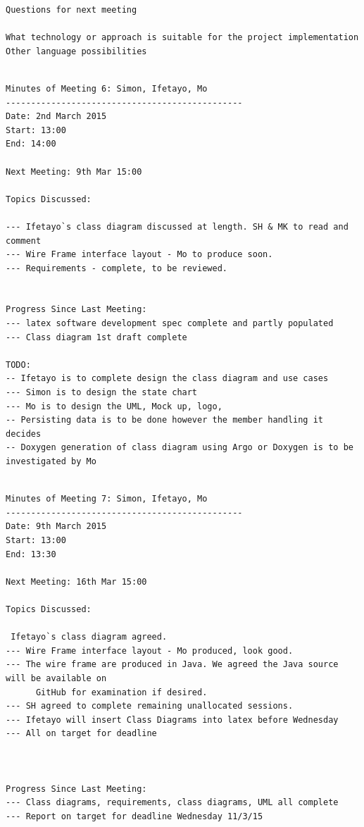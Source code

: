 \documentclass[a4paper,10pt]{article}
\begin{document}
\begin{appendices}
\begin{lstlisting}[frame=single,caption=Meeting of 26/2/15,label=minutes5]
Questions for next meeting

What technology or approach is suitable for the project implementation
Other language possibilities

\end{lstlisting}

\begin{lstlisting}[frame=single,caption=Meeting of 2/3/15,label=minutes6]

Minutes of Meeting 6: Simon, Ifetayo, Mo
-----------------------------------------------
Date: 2nd March 2015
Start: 13:00
End: 14:00

Next Meeting: 9th Mar 15:00

Topics Discussed:

--- Ifetayo`s class diagram discussed at length. SH & MK to read and comment
--- Wire Frame interface layout - Mo to produce soon.
--- Requirements - complete, to be reviewed.


Progress Since Last Meeting:
--- latex software development spec complete and partly populated
--- Class diagram 1st draft complete

TODO:
-- Ifetayo is to complete design the class diagram and use cases
--- Simon is to design the state chart
--- Mo is to design the UML, Mock up, logo, 
-- Persisting data is to be done however the member handling it decides
-- Doxygen generation of class diagram using Argo or Doxygen is to be investigated by Mo

\end{lstlisting}

\begin{lstlisting}[frame=single,caption=Meeting of 9/3/15,label=minutes7]

Minutes of Meeting 7: Simon, Ifetayo, Mo
-----------------------------------------------
Date: 9th March 2015
Start: 13:00
End: 13:30

Next Meeting: 16th Mar 15:00

Topics Discussed:

 Ifetayo`s class diagram agreed.
--- Wire Frame interface layout - Mo produced, look good.
--- The wire frame are produced in Java. We agreed the Java source will be available on
      GitHub for examination if desired. 
--- SH agreed to complete remaining unallocated sessions.
--- Ifetayo will insert Class Diagrams into latex before Wednesday
--- All on target for deadline



Progress Since Last Meeting:
--- Class diagrams, requirements, class diagrams, UML all complete
--- Report on target for deadline Wednesday 11/3/15


\end{lstlisting}
\end{appendices}
\end{document}
